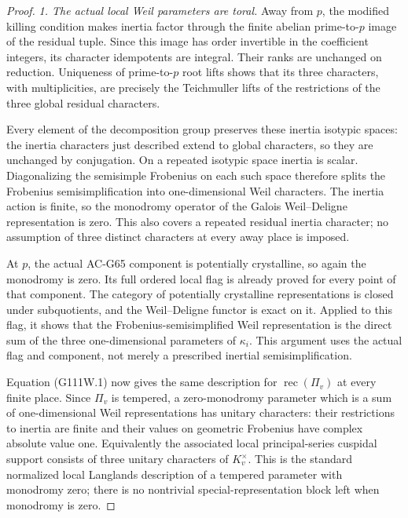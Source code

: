 \begin{proof}
\emph{1. The actual local Weil parameters are toral.}
Away from \(p\), the modified killing condition makes
inertia factor through the finite abelian prime-to-\(p\)
image of the residual tuple. Since this image has order
invertible in the coefficient integers, its character
idempotents are integral. Their ranks are unchanged on
reduction. Uniqueness of prime-to-\(p\) root lifts shows
that its three characters, with multiplicities, are
precisely the Teichmuller lifts of the restrictions of
the three global residual characters.

Every element of the decomposition group preserves these
inertia isotypic spaces: the inertia characters just
described extend to global characters, so they are
unchanged by conjugation. On a repeated isotypic space
inertia is scalar. Diagonalizing the semisimple Frobenius
on each such space therefore splits the Frobenius
semisimplification into one-dimensional Weil characters.
The inertia action is finite, so the monodromy operator
of the Galois Weil--Deligne representation is zero.
This also covers a repeated residual inertia character;
no assumption of three distinct characters at every
away place is imposed.

At \(p\), the actual AC-G65 component is potentially
crystalline, so again the monodromy is zero. Its full
ordered local flag is already proved for every point of
that component. The category of potentially crystalline
representations is closed under subquotients, and the
Weil--Deligne functor is exact on it. Applied to this
flag, it shows that the Frobenius-semisimplified Weil
representation is the direct sum of the three
one-dimensional parameters of \(\kappa_i\).
This argument uses the actual flag and component, not
merely a prescribed inertial semisimplification.

Equation (G111W.1) now gives the same description for
\(\operatorname{rec}(\Pi_v)\) at every finite place.
Since \(\Pi_v\) is tempered, a zero-monodromy parameter
which is a sum of one-dimensional Weil representations
has unitary characters: their restrictions to inertia
are finite and their values on geometric Frobenius
have complex absolute value one. Equivalently the
associated local principal-series cuspidal support
consists of three unitary characters of \(K_v^\times\).
This is the standard normalized local Langlands
description of a tempered parameter with monodromy
zero; there is no nontrivial special-representation
block left when monodromy is zero.


\end{proof}
